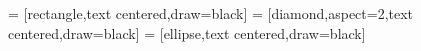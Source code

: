 \newcommand{\tablelst}[2][]{\lstinline[#1]{#2}}
\newenvironment{savelst}[1]
{\expandafter\newbox\csname lstbox#1\endcsname\lrbox{\csname lstbox#1\endcsname}}
{\endlrbox}
\newcommand{\loadlst}[1]{\usebox{\csname lstbox#1\endcsname}}


 = [rectangle,text centered,draw=black]
 = [diamond,aspect=2,text centered,draw=black]
 = [ellipse,text centered,draw=black]
\newcommand{\foreignkey}{\rotatebox{90}{\usymW{2799}{.8em}}\,}